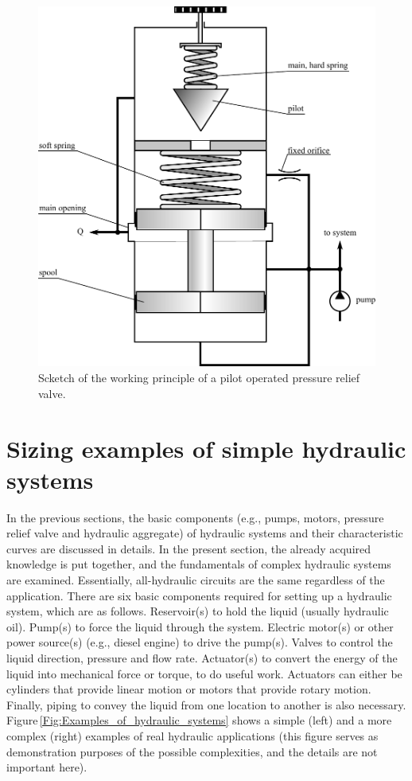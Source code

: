 \begin{figure}[ht!]
	\centering
		\includegraphics[height=12cm]{PositiveDisplacementPumps/Figures/Pilot_Operated_PRV.pdf}
	\caption{Scketch of the working principle of a pilot operated pressure relief valve.}
	\label{fig:pilot_operated_PRV}
\end{figure}

\section{Sizing examples of simple hydraulic systems} \label{sec:sizing_of_hydraulic_systems}

In the previous sections, the basic components (e.g., pumps, motors, pressure relief valve and hydraulic aggregate) of hydraulic systems and their characteristic curves are discussed in details. In the present section, the already acquired knowledge is put together, and the fundamentals of complex hydraulic systems are examined. Essentially, all-hydraulic circuits are the same regardless of the application. There are six basic components required for setting up a hydraulic system, which are as follows. Reservoir(s) to hold the liquid (usually hydraulic oil). Pump(s) to force the liquid through the system. Electric motor(s) or other power source(s) (e.g., diesel engine) to drive the pump(s). Valves to control the liquid direction, pressure and flow rate. Actuator(s) to convert the energy of the liquid into mechanical force or torque, to do useful work. Actuators can either be cylinders that provide linear motion or motors that provide rotary motion. Finally, piping to convey the liquid from one location to another is also necessary. Figure\,\ref{Fig:Examples_of_hydraulic_systems} shows a simple (left) and a more complex (right) examples of real hydraulic applications (this figure serves as demonstration purposes of the possible complexities, and the details are not important here).


